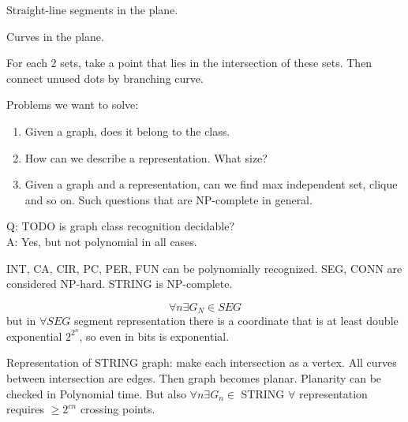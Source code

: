 \begin{definition}
	Straight-line segments in the plane.
\end{definition}

\begin{definition}
	Curves in the plane.
\end{definition}

For each 2 sets, take a point that lies in the intersection of these sets.
Then connect unused dots by branching curve.

Problems we want to solve:
\begin{enumerate}
	\item Given a graph, does it belong to the class.
	\item How can we describe a representation. What size?
	\item Given a graph and a representation, can we find max independent set, clique and so on.
	Such questions that are NP-complete in general.
\end{enumerate}

Q: TODO is graph class recognition decidable?\\
A: Yes, but not polynomial in all cases.

INT, CA, CIR, PC, PER, FUN can be polynomially recognized.
SEG, CONN are considered NP-hard.
STRING is NP-complete.

\[ \forall n \exists G_N \in SEG\]
but in $\forall SEG$ segment representation there is a coordinate that is at least double exponential $2^{2^n}$, so even in bits is exponential.

Representation of STRING graph: make each intersection as a vertex.
All curves between intersection are edges.
Then graph becomes planar.
Planarity can be checked in Polynomial time.
But also $\forall n \exists G_n \in $ STRING $\forall$ representation requires $\geq 2^{cn}$ crossing points.
